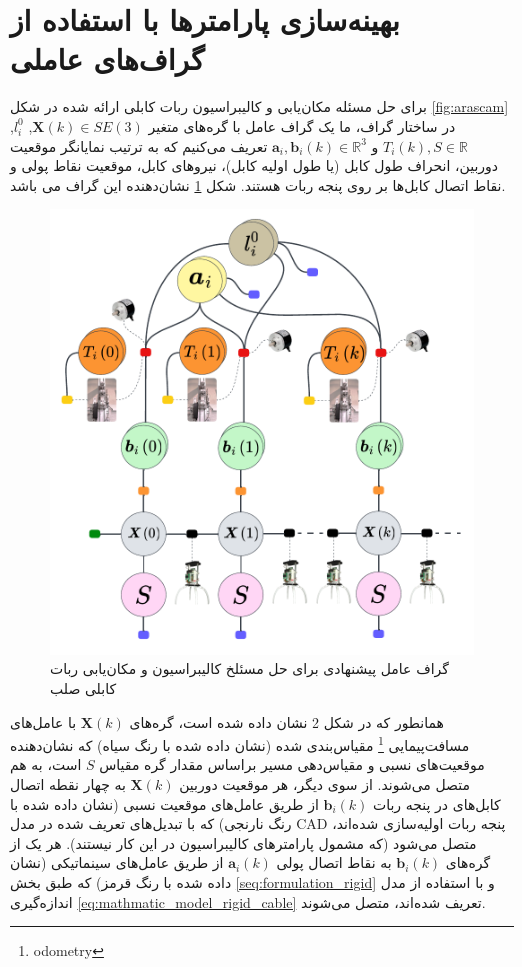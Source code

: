 \section{بهینه‌سازی پارامترها با استفاده از گراف‌های عاملی} \label{seq:factor_graph_for_rigid_cable}

برای حل مسئله مکان‌یابی و کالیبراسیون ربات کابلی ارائه شده در شکل
\ref{fig:arascam}
در ساختار گراف، ما یک گراف عامل با گره‌های متغیر 
$\boldsymbol{X}(k) \in SE(3)$,
$l_{i}^0$,
$T_i(k), S \in \mathbb{R}$ 
و
$\boldsymbol{a}_i, \boldsymbol{b}_i(k) \in \mathbb{R}^3$ 
تعریف می‌کنیم که به ترتیب نمایانگر موقعیت دوربین، انحراف طول کابل (یا طول اولیه کابل)، نیرو‌های کابل، موقعیت نقاط پولی و نقاط اتصال کابل‌ها بر روی پنجه ربات هستند. شکل 
\ref{fig:rigidcable_factorgraph}
نشان‌دهنده این گراف می باشد. 

\begin{figure}[hb]
	\centering
	\includegraphics[width=0.7\linewidth]{img/rigidcable_factorgraph}
	\caption{گراف عامل پیشنهادی برای حل مسئلخ کالیبراسیون و مکان‌یابی ربات کابلی صلب}
	\label{fig:rigidcable_factorgraph}
\end{figure}


همانطور که در شکل 2 نشان داده شده است، گره‌های
$\boldsymbol{X}(k)$
با عامل‌های مسافت‌پیمایی
\footnote{odometry}
 مقیاس‌بندی شده (نشان داده شده با رنگ سیاه) که نشان‌دهنده موقعیت‌های نسبی و مقیاس‌دهی مسیر براساس مقدار گره مقیاس 
$S$
 است، به هم متصل می‌شوند. از سوی دیگر، هر موقعیت دوربین 
$\boldsymbol{X}(k)$
 به چهار نقطه اتصال کابل‌های در پنجه ربات
$\boldsymbol{b}_i(k)$
از طریق عامل‌های موقعیت نسبی (نشان داده شده با رنگ نارنجی) که با تبدیل‌های تعریف شده در مدل CAD پنجه ربات اولیه‌سازی شده‌اند، متصل می‌شود (که مشمول پارامترهای کالیبراسیون در این کار نیستند). هر یک از گره‌های
$\boldsymbol{b}_i(k)$
به نقاط اتصال پولی
$\boldsymbol{a}_i(k)$
از طریق عامل‌های سینماتیکی (نشان داده شده با رنگ قرمز) که طبق بخش 
\ref{seq:formulation_rigid}
 و با استفاده از مدل اندازه‌گیری
\ref{eq:mathmatic_model_rigid_cable}
تعریف شده‌اند، متصل می‌شوند.


